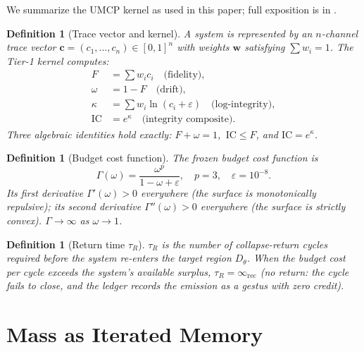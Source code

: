 \documentclass[
  aps,
  prd,
  twocolumn,
  superscriptaddress,
  nofootinbib,
  floatfix
]{revtex4-2}
\newtheorem{definition}[theorem]{Definition}
\newcommand{\tR}{\tau_{\!R}}
\newcommand{\Gam}{\Gamma}
\newcommand{\eps}{\varepsilon}
\newcommand{\IR}{\infty_{\mathrm{rec}}}
\newcommand{\IC}{\mathrm{IC}}
\begin{document}
We summarize the UMCP kernel as used in this paper; full
exposition is in \cite{paulus2025umcp,paulus2025physicscoherence}.

\begin{definition}[Trace vector and kernel]
A system is represented by an $n$-channel trace vector
$\mathbf{c} = (c_1, \dots, c_n) \in [0,1]^n$ with
weights $\mathbf{w}$ satisfying $\sum w_i = 1$.  The
Tier-1 kernel computes:
\begin{align}
  F   &= \textstyle\sum w_i c_i
         \quad\text{(fidelity)},\\
  \omega &= 1 - F
         \quad\text{(drift)},\\
  \kappa &= \textstyle\sum w_i \ln(c_i + \eps)
         \quad\text{(log-integrity)},\\
  \IC &= e^{\kappa}
         \quad\text{(integrity composite)}.
\end{align}
Three algebraic identities hold exactly: $F + \omega = 1$,
$\,\IC \leq F$, and $\IC = e^\kappa$.
\end{definition}

\begin{definition}[Budget cost function]
The frozen budget cost function is
\begin{equation}
  \Gam(\omega) = \frac{\omega^p}{1 - \omega + \eps},
  \quad p = 3,\quad \eps = 10^{-8}.
  \label{eq:Gamma}
\end{equation}
Its first derivative $\Gam'(\omega) > 0$ everywhere (the
surface is monotonically repulsive); its second derivative
$\Gam''(\omega) > 0$ everywhere (the surface is strictly
convex).  $\Gam \to \infty$ as $\omega \to 1$.
\end{definition}

\begin{definition}[Return time $\tR$]
$\tR$ is the number of collapse-return cycles required
before the system re-enters the target region $D_\theta$.
When the budget cost per cycle exceeds the system's
available surplus, $\tR = \IR$ (no return: the cycle
fails to close, and the ledger records the emission as a
\emph{gestus} with zero credit).
\end{definition}

\section{Mass as Iterated Memory}\label{sec:mass}
\end{document}
